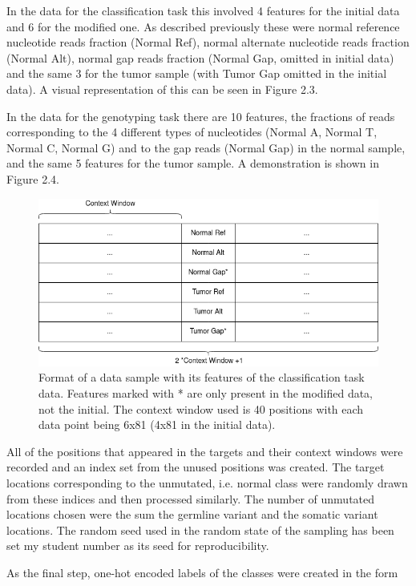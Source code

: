 \documentclass[bsc,frontabs,singlespacing,parskip,deptreport]{infthesis}
\begin{document}
In the data for the classification task this involved 4 features for the initial data and 6 for the modified one. As described previously these were normal reference nucleotide reads fraction (Normal Ref), normal alternate nucleotide reads fraction (Normal Alt), normal gap reads fraction (Normal Gap, omitted in initial data) and the same 3 for the tumor sample (with Tumor Gap omitted in the initial data). A visual representation of this can be seen in Figure 2.3.

In the data for the genotyping task there are 10 features, the fractions of reads corresponding to the 4 different types of nucleotides (Normal A, Normal T, Normal C, Normal G) and to the gap reads (Normal Gap) in the normal sample, and the same 5 features for the tumor sample. A demonstration is shown in Figure 2.4.

\begin{figure}
\centering
\includegraphics[width = 5in]{classification_features}
\setlength{\belowcaptionskip}{0pt}
\caption{Format of a data sample with its features of the classification task data. Features marked with * are only present in the modified data, not the initial. The context window used is 40 positions with each data point being 6x81 (4x81 in the initial data).}
\label{classification_features}
\vskip -5mm
\end{figure}

All of the positions that appeared in the targets and their context windows were recorded and an index set from the unused positions was created. The target locations corresponding to the unmutated, i.e. normal class were randomly drawn from these indices and then processed similarly. The number of unmutated locations chosen were the sum the germline variant and the somatic variant locations. The random seed used in the random state of the sampling has been set my student number as its seed for reproducibility.

As the final step, one-hot encoded labels of the classes were created in the form
\end{document}

